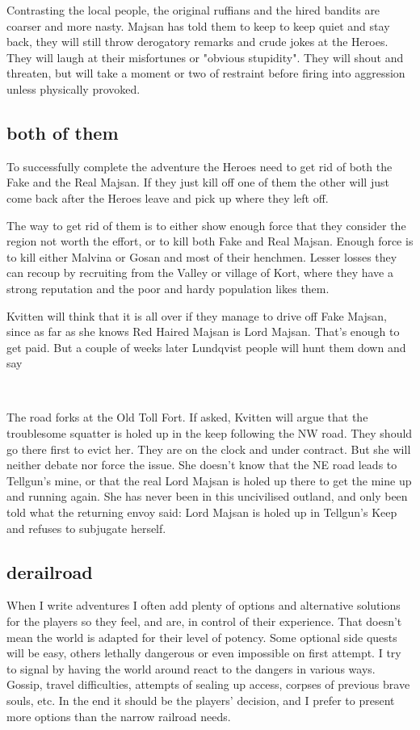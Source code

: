 Contrasting the local people, the original ruffians and the hired bandits are coarser and more nasty. Majsan has told them to keep to keep quiet and stay back, they will still throw derogatory remarks and crude jokes at the Heroes. They will laugh at their misfortunes or "obvious stupidity". They will shout and threaten, but will take a moment or two of restraint before firing into aggression unless physically provoked.


\subsection*{both of them}
To successfully complete the adventure the Heroes need to get rid of both the Fake and the Real Majsan. If they just kill off one of them the other will just come back after the Heroes leave and pick up where they left off.

The way to get rid of them is to either show enough force that they consider the region not worth the effort, or to kill both Fake and Real Majsan. Enough force is to kill either Malvina or Gosan and most of their henchmen. Lesser losses they can recoup by recruiting from the Valley or village of Kort, where they have a strong reputation and the poor and hardy population likes them.

Kvitten will think that it is all over if they manage to drive off Fake Majsan, since as far as she knows Red Haired Majsan is Lord Majsan. That's enough to get paid. But a couple of weeks later Lundqvist people will hunt them down and say

\

The road forks at the Old Toll Fort. If asked, Kvitten will argue that the troublesome squatter is holed up in the keep following the NW road. They should go there first to evict her. They are on the clock and under contract. But she will neither debate nor force the issue. She doesn't know that the NE road leads to Tellgun's mine, or that the real Lord Majsan is holed up there to get the mine up and running again. She has never been in this uncivilised outland, and only been told what the returning envoy said: Lord Majsan is holed up in Tellgun's Keep and refuses to subjugate herself.


\subsection*{derailroad}
When I write adventures I often add plenty of options and alternative solutions for the players so they feel, and are, in control of their experience. That doesn't mean the world is adapted for their level of potency. Some optional side quests will be easy, others lethally dangerous or even impossible on first attempt. I try to signal by having the world around react to the dangers in various ways. Gossip, travel difficulties, attempts of sealing up access, corpses of previous brave souls, etc. In the end it should be the players' decision, and I prefer to present more options than the narrow railroad needs.

